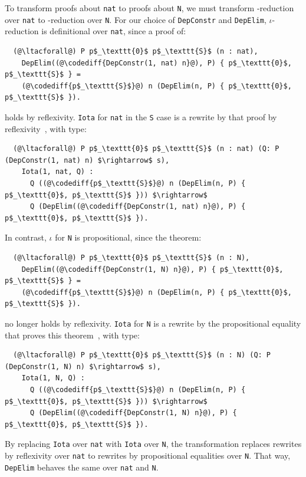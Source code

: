To transform proofs about \lstinline{nat} to proofs about \lstinline{N}, we must transform  \kl{$\iota$}-reduction over \lstinline{nat} to 
 \kl{$\iota$}-reduction over \lstinline{N}.
For our choice of \lstinline{DepConstr} and \lstinline{DepElim},
$\iota$-reduction is definitional over \lstinline{nat}, since a proof of:

\begin{lstlisting}
  (@\ltacforall@) P p$_\texttt{0}$ p$_\texttt{S}$ (n : nat),
    DepElim((@\codediff{DepConstr(1, nat) n}@), P) { p$_\texttt{0}$, p$_\texttt{S}$ } =
    (@\codediff{p$_\texttt{S}$}@) n (DepElim(n, P) { p$_\texttt{0}$, p$_\texttt{S}$ }).
\end{lstlisting}
holds by reflexivity.
\lstinline{Iota} for \lstinline{nat} in the \lstinline{S} case is a rewrite by that proof by reflexivity~\href{https://github.com/uwplse/pumpkin-pi/blob/v2.0.0/plugin/coq/nonorn.v}{},
with type:

\begin{lstlisting}
  (@\ltacforall@) P p$_\texttt{0}$ p$_\texttt{S}$ (n : nat) (Q: P (DepConstr(1, nat) n) $\rightarrow$ s),
    Iota(1, nat, Q) :
      Q ((@\codediff{p$_\texttt{S}$}@) n (DepElim(n, P) { p$_\texttt{0}$, p$_\texttt{S}$ })) $\rightarrow$
      Q (DepElim((@\codediff{DepConstr(1, nat) n}@), P) { p$_\texttt{0}$, p$_\texttt{S}$ }).
\end{lstlisting}
In contrast, $\iota$ for \lstinline{N} is propositional, since the 
theorem: %

\begin{lstlisting}
  (@\ltacforall@) P p$_\texttt{0}$ p$_\texttt{S}$ (n : N),
    DepElim((@\codediff{DepConstr(1, N) n}@), P) { p$_\texttt{0}$, p$_\texttt{S}$ } =
    (@\codediff{p$_\texttt{S}$}@) n (DepElim(n, P) { p$_\texttt{0}$, p$_\texttt{S}$ }).
\end{lstlisting}
no longer holds by reflexivity.
\lstinline{Iota} for \lstinline{N} is a rewrite by the propositional equality that proves this theorem~\href{https://github.com/uwplse/pumpkin-pi/blob/v2.0.0/plugin/coq/nonorn.v}{},
with type:

\begin{lstlisting}
  (@\ltacforall@) P p$_\texttt{0}$ p$_\texttt{S}$ (n : N) (Q: P (DepConstr(1, N) n) $\rightarrow$ s),
    Iota(1, N, Q) :
      Q ((@\codediff{p$_\texttt{S}$}@) n (DepElim(n, P) { p$_\texttt{0}$, p$_\texttt{S}$ })) $\rightarrow$
      Q (DepElim((@\codediff{DepConstr(1, N) n}@), P) { p$_\texttt{0}$, p$_\texttt{S}$ }).
\end{lstlisting}
By replacing \lstinline{Iota} over \lstinline{nat} with \lstinline{Iota} over \lstinline{N},
the transformation replaces rewrites by reflexivity over \lstinline{nat} to rewrites by propositional equalities over \lstinline{N}.
That way, \lstinline{DepElim} behaves the same over \lstinline{nat} and \lstinline{N}.


